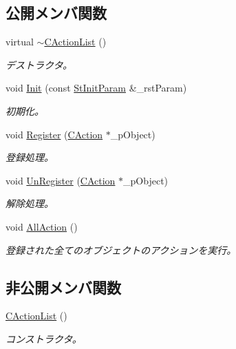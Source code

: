 \subsection*{公開メンバ関数}
\begin{DoxyCompactItemize}
\item 
virtual \hyperlink{class_c_action_list_aaaa39fed12095bb0095c51d27ca19443}{$\sim$\+C\+Action\+List} ()
\begin{DoxyCompactList}\small\item\em デストラクタ。 \end{DoxyCompactList}\item 
void \hyperlink{class_c_action_list_abdfe27d4d3e92e7de8e2b91c7cf17574}{Init} (const \hyperlink{struct_c_action_list_1_1_st_init_param}{St\+Init\+Param} \&\+\_\+rst\+Param)
\begin{DoxyCompactList}\small\item\em 初期化。 \end{DoxyCompactList}\item 
void \hyperlink{class_c_action_list_aa1341ee2595b0c1ae226123dccef0477}{Register} (\hyperlink{class_c_action}{C\+Action} $\ast$\+\_\+p\+Object)
\begin{DoxyCompactList}\small\item\em 登録処理。 \end{DoxyCompactList}\item 
void \hyperlink{class_c_action_list_a916677de8c5f6c39846f46800ef0f0e7}{Un\+Register} (\hyperlink{class_c_action}{C\+Action} $\ast$\+\_\+p\+Object)
\begin{DoxyCompactList}\small\item\em 解除処理。 \end{DoxyCompactList}\item 
void \hyperlink{class_c_action_list_aa3d82dc70353a5fc2dd10fc6a2800f85}{All\+Action} ()
\begin{DoxyCompactList}\small\item\em 登録された全てのオブジェクトのアクションを実行。 \end{DoxyCompactList}\end{DoxyCompactItemize}
\subsection*{非公開メンバ関数}
\begin{DoxyCompactItemize}
\item 
\hyperlink{class_c_action_list_ae814ffecb31176127c16fbf8b8619853}{C\+Action\+List} ()
\begin{DoxyCompactList}\small\item\em コンストラクタ。 \end{DoxyCompactList}\end{DoxyCompactItemize}
